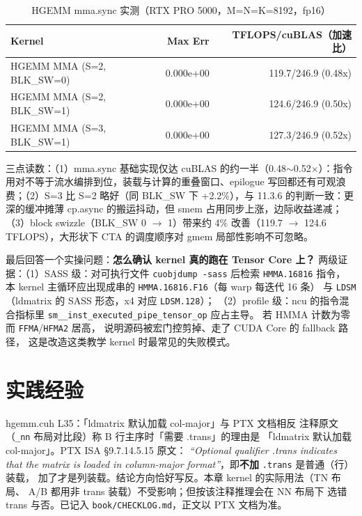 \begin{table}[H]
\centering
\caption{HGEMM mma.sync 实测（RTX PRO 5000，M=N=K=8192，fp16）}
\label{tab:ch11-perf}
\small
\begin{tabular}{lrr}
\toprule
Kernel & Max Err & TFLOPS/cuBLAS（加速比） \\
\midrule
HGEMM MMA (S=2, BLK\_SW=0) & 0.000e+00 & 119.7/246.9 (0.48x) \\
HGEMM MMA (S=2, BLK\_SW=1) & 0.000e+00 & 124.6/246.9 (0.50x) \\
HGEMM MMA (S=3, BLK\_SW=1) & 0.000e+00 & 127.3/246.9 (0.52x) \\
\bottomrule
\end{tabular}
\end{table}

三点读数：（1）mma.sync 基础实现仅达 cuBLAS 的约一半（0.48$\sim$0.52$\times$）：指令用对不等于流水编排到位，装载与计算的重叠窗口、epilogue 写回都还有可观浪费；（2）S=3 比 S=2 略好（同 BLK\_SW 下 +2.2\%），与 11.3.6 的判断一致：更深的缓冲摊薄 cp.async 的搬运抖动，但 smem 占用同步上涨，边际收益递减；（3）block swizzle（BLK\_SW 0 $\to$ 1）带来约 4\% 改善（119.7 $\to$ 124.6 TFLOPS），大形状下 CTA 的调度顺序对 gmem 局部性影响不可忽略。

最后回答一个实操问题：\textbf{怎么确认 kernel 真的跑在 Tensor Core 上？}
两级证据：（1）SASS 级：对可执行文件
\texttt{cuobjdump -sass} 后检索 \texttt{HMMA.16816} 指令，
本 kernel 主循环应出现成串的 \texttt{HMMA.16816.F16}（每 warp 每迭代 16 条）
与 \texttt{LDSM}（ldmatrix 的 SASS 形态，x4 对应 \texttt{LDSM.128}）；
（2）profile 级：ncu 的指令混合指标里
\texttt{sm\_\allowbreak{}\_\allowbreak{}inst\_\allowbreak{}executed\_\allowbreak{}pipe\_\allowbreak{}tensor\_\allowbreak{}op} 应占主导。
若 HMMA 计数为零而 \texttt{FFMA}/\texttt{HFMA2} 居高，
说明源码被宏门控剪掉、走了 CUDA Core 的 fallback 路径，
这是改造这类教学 kernel 时最常见的失败模式。

\section{实践经验}

\begin{kaogu}[F2]{hgemm.cuh L35：「ldmatrix 默认加载 col-major」与 PTX 文档相反}
  注释原文（\texttt{\_nn} 布局对比段）称 B 行主序时「需要 .trans」的理由是
  「ldmatrix 默认加载 col-major」。PTX ISA §9.7.14.5.15 原文：
  \emph{``Optional qualifier .trans indicates that the matrix is loaded in
  column-major format''}，即\textbf{不加} \texttt{.trans} 是普通（行）装载，
  加了才是列装载。结论方向恰好写反。本章 kernel 的实际用法（TN 布局、
  A/B 都用非 trans 装载）不受影响；但按该注释推理会在 NN 布局下
  选错 trans 与否。已记入 \texttt{book/\allowbreak{}CHECKLOG.\allowbreak{}md}，正文以 PTX 文档为准。
\end{kaogu}


